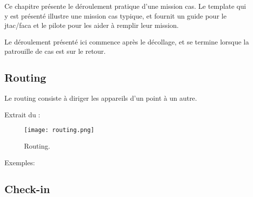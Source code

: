 \begin{e1}
	\item
	Ce chapitre présente le déroulement pratique d’une mission \acrshort{cas}. Le template qui y est présenté illustre une mission \acrshort{cas} typique, et fournit un guide pour le \acrshort{jtac}/\acrshort{faca} et le pilote pour les aider à remplir leur mission.
	\item Le déroulement présenté ici commence après le décollage, et se termine lorsque la patrouille de \acrshort{cas} est sur le retour.
\end{e1}

\subsection{Routing}
\begin{e1}
	\item Le routing consiste à diriger les appareils d’un point à un autre.
	\item Extrait du \jp:\\
	\begin{figure}[H]
		\texttt{[image: routing.png]}
		\caption{Routing.}
		\label{fig:routing}
	\end{figure}
	\item Exemples:\\
\end{e1}

\subsection{Check-in}

